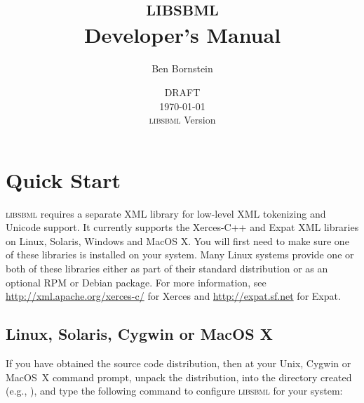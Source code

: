 \documentclass{sbmlmanual}
\newcommand{\libsbml}{\textsc{libsbml}}
\begin{document}

\title{\libsbml{}\\[5pt]
  Developer's Manual}

\author{Ben Bornstein}


\address{The SBML Team\\
  Control and Dynamical Systems, MC 107-81\\
  California Institute of Technology, Pasadena, CA 91125, USA\\[2pt]
  {\url{http://www.sbml.org/}}}

\date{DRAFT\\[5pt]
  \today{}\\[10pt]%
  \hspace*{-1ex}\libsbml{} Version %
}

\maketitlepage


\section{Quick Start}
\label{sec:quickstart-unix}

\libsbml{} requires a separate XML library for low-level XML tokenizing and
Unicode support.  It currently supports the Xerces-C++ and Expat XML
libraries on Linux, Solaris, Windows and MacOS X.  You will first need to
make sure one of these libraries is installed on your system.  Many Linux
systems provide one or both of these libraries either as part of their
standard distribution or as an optional RPM or Debian package.  For more
information, see \url{http://xml.apache.org/xerces-c/} for Xerces and
\url{http://expat.sf.net} for Expat.

\subsection{Linux, Solaris, Cygwin or MacOS X}

If you have obtained the source code distribution, then at your Unix,
Cygwin or MacOS~X command prompt, unpack the distribution,  into
the directory created (e.g., ), and type the
following command to configure \libsbml{} for your system:
\end{document}

